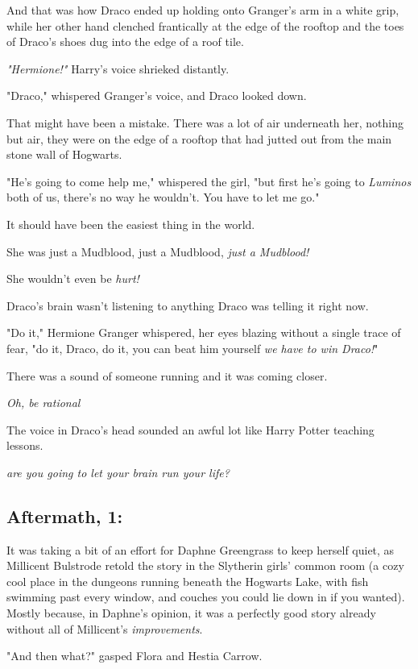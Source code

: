 And that was how Draco ended up holding onto Granger's arm in a white grip,
while her other hand clenched frantically at the edge of the rooftop and the
toes of Draco's shoes dug into the edge of a roof tile.

\emph{"Hermione!"} Harry's voice shrieked distantly.

"Draco," whispered Granger's voice, and Draco looked down.

That might have been a mistake. There was a lot of air underneath her, nothing
but air, they were on the edge of a rooftop that had jutted out from the main
stone wall of Hogwarts.

"He's going to come help me," whispered the girl, "but first he's going to
\emph{Luminos} both of us, there's no way he wouldn't. You have to let me go."

It should have been the easiest thing in the world.

She was just a Mudblood, just a Mudblood, \emph{just a Mudblood!}

She wouldn't even be \emph{hurt!}

{\el} Draco's brain wasn't listening to anything Draco was telling it right
now.

"Do it," Hermione Granger whispered, her eyes blazing without a single trace of
fear, "do it, Draco, do it, you can beat him yourself \emph{we have to win
Draco!}"

There was a sound of someone running and it was coming closer.

\emph{Oh, be rational{\el}}

The voice in Draco's head sounded an awful lot like Harry Potter teaching
lessons.

{\el} \emph{are you going to let your brain run your life?}
\sbreak
\subsection{Aftermath, 1:}

It was taking a bit of an effort for Daphne Greengrass to keep herself quiet,
as Millicent Bulstrode retold the story in the Slytherin girls' common room (a
cozy cool place in the dungeons running beneath the Hogwarts Lake, with fish
swimming past every window, and couches you could lie down in if you wanted).
Mostly because, in Daphne's opinion, it was a perfectly good story already
without all of Millicent's \emph{improvements}.

"And then what?" gasped Flora and Hestia Carrow.

